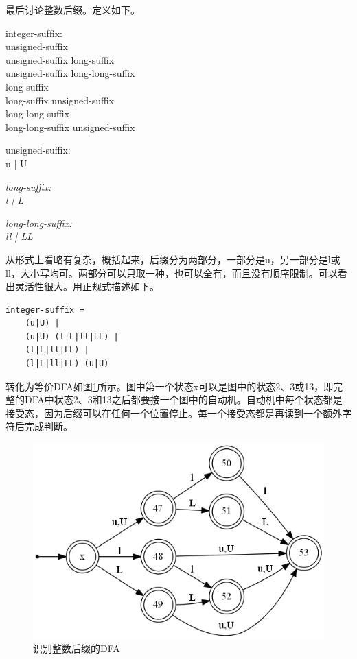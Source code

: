 \documentclass[UTF8, twoside, titlepage]{ctexart}
\newenvironment{lex}
{
	\linespread{1.2}
	\leftskip=2.5cm
	\rightskip=2.5cm
	\itshape
	\setlength{\parindent}{-1cm}
}
{\par}
\begin{document}
最后讨论整数后缀。定义如下。

\begin{lex}
integer-sufﬁx:\\
	unsigned-suffix \\
	unsigned-suffix long-suffix \\
	unsigned-suffix long-long-suffix \\
	long-suffix \\
	long-suffix unsigned-suffix \\
	long-long-suffix \\
	long-long-suffix unsigned-suffix
	
unsigned-suffix: \\
{
	\normalfont
	\ttfamily
	u | U
}

\itshape
long-suffix: \\
{
	\normalfont
	\ttfamily
	l | L
}

\itshape
long-long-suffix: \\
{
	\normalfont
	\ttfamily
	ll | LL
}
\end{lex}

从形式上看略有复杂，概括起来，后缀分为两部分，一部分是u，另一部分是l或ll，大小写均可。两部分可以只取一种，也可以全有，而且没有顺序限制。可以看出灵活性很大。用正规式描述如下。

\begin{lstlisting}
integer-suffix = 
	(u|U) |
	(u|U) (l|L|ll|LL) |
	(l|L|ll|LL) |
	(l|L|ll|LL) (u|U)
\end{lstlisting}

转化为等价DFA如图\ref{fig:int_suffix}所示。图中第一个状态x可以是图中的状态2、3或13，即完整的DFA中状态2、3和13之后都要接一个图中的自动机。自动机中每个状态都是接受态，因为后缀可以在任何一个位置停止。每一个接受态都是再读到一个额外字符后完成判断。

\begin{figure}[htbp]
	\centering
	\includegraphics[scale=0.54]{images/int_suffix.png}
	\caption{识别整数后缀的DFA}
	\label{fig:int_suffix}
\end{figure}
\end{document}
